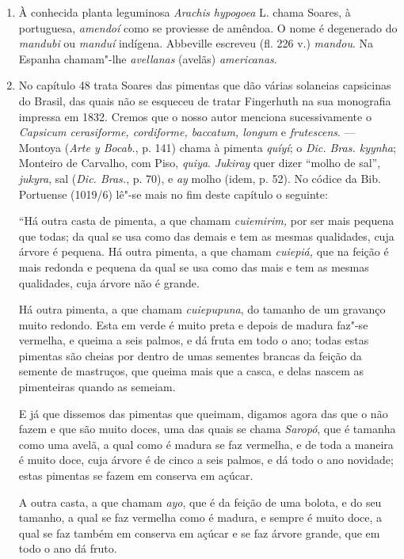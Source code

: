 \begin{enumerate}
\item À conhecida planta leguminosa \textit{Arachis hypogoea} L. chama Soares, à portuguesa,  
\textit{amendoí} como se proviesse de amêndoa. O nome é degenerado do \textit{mandubi} ou \textit{manduí}
indígena. Abbeville escreveu (fl. 226 v.) \textit{mandou}. Na  Espanha  chamam"-lhe  
\textit{avellanas} (avelãs) \textit{americanas}.

\item No capítulo 48 trata Soares das pimentas que dão várias solaneias capsicinas do 
Brasil, das quais não se esqueceu de tratar Fingerhuth na sua monografia impressa em 
1832. Cremos que o nosso autor menciona sucessivamente o \textit{Capsicum cerasiforme, 
cordiforme, baccatum, longum} e \textit{frutescens}. --- Montoya (\textit{Arte y Bocab.}, p. 141) chama à 
pimenta \textit{quíyí}; o \textit{Dic. Bras. kyynha}; Monteiro de Carvalho, com Piso, \textit{quiya}.
\textit{Jukiray} quer dizer ``molho de sal'',  \textit{jukyra}, sal (\textit{Dic. Bras.}, p. 70), e \textit{ay} molho (idem, p. 52).
No códice da Bib. Portuense (1019/6) lê"-se mais no fim deste capítulo o seguinte:

``Há outra casta de pimenta, a que chamam \textit{cuiemirim,} por ser mais pequena que todas; 
da qual se usa como das demais e tem as mesmas qualidades, cuja árvore é pequena.
Há outra pimenta, a que chamam \textit{cuiepiá,} que na feição é mais redonda e pequena da qual se 
usa como das mais e tem as mesmas qualidades, cuja árvore não é grande.

Há outra pimenta, a que chamam \textit{cuiepupuna}, do tamanho de um gravanço muito redondo. 
Esta em verde é muito preta e depois de madura faz"-se vermelha, e queima a seis 
palmos, e dá fruta em todo o ano; todas estas pimentas são cheias por dentro de umas 
sementes brancas da feição da semente de mastruços, que queima mais que a casca, e delas 
nascem as pimenteiras quando as semeiam. 

E já que dissemos das pimentas que queimam, digamos agora das que o não fazem e 
que são muito doces, uma das quais se chama \textit{Saropó}, que é tamanha como uma avelã, a 
qual como é madura se faz vermelha, e de toda a maneira é muito doce, cuja árvore é de 
cinco a seis palmos, e dá todo o ano novidade; estas pimentas se fazem em conserva em 
açúcar. 

A outra casta, a que chamam \textit{ayo}, que é da feição de uma bolota, e do seu tamanho, a 
qual se faz vermelha como é madura, e sempre é muito doce, a qual se faz também em 
conserva em açúcar e se faz árvore grande, que em todo o ano dá fruto. 


\end{enumerate}
